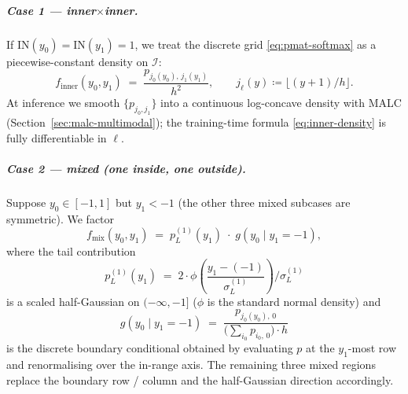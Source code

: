 \subparagraph{Case 1 --- inner$\times$inner.} If
$\mathrm{IN}(y_0)\!=\!\mathrm{IN}(y_1)\!=\!1$, we treat the discrete
grid \eqref{eq:pmat-softmax} as a piecewise-constant density on
$\mathcal{I}$:
\begin{equation}
f_{\mathrm{inner}}(y_0, y_1)
\;=\;
\frac{p_{j_0(y_0),\, j_1(y_1)}}{h^{2}},
\qquad
j_\ell(y) \coloneqq \bigl\lfloor (y + 1)/h \bigr\rfloor.
\label{eq:inner-density}
\end{equation}
At inference we smooth $\{p_{j_0, j_1}\}$ into a continuous log-concave
density with MALC (Section~\ref{sec:malc-multimodal}); the training-time
formula \eqref{eq:inner-density} is fully differentiable in $\ell$.

\subparagraph{Case 2 --- mixed (one inside, one outside).}
Suppose $y_0 \in [-1,1]$ but $y_1 < -1$ (the other three mixed
subcases are symmetric). We factor
\begin{equation}
f_{\mathrm{mix}}(y_0, y_1)
\;=\;
p_{L}^{(1)}(y_1)\; \cdot \; g(y_0 \mid y_1 = -1),
\label{eq:mix-density}
\end{equation}
where the tail contribution
\begin{equation}
p_{L}^{(1)}(y_1)
\;=\;
2 \cdot \phi\!\left(\frac{y_1 - (-1)}{\sigma_{L}^{(1)}}\right)
\bigg/ \sigma_{L}^{(1)}
\end{equation}
is a scaled half-Gaussian on $(-\infty, -1]$ ($\phi$ is the standard
normal density) and
\begin{equation}
g(y_0 \mid y_1 = -1)
\;=\;
\frac{p_{j_0(y_0),\, 0}}{\bigl(\textstyle\sum_{i_0} p_{i_0,\, 0}\bigr) \cdot h}
\label{eq:boundary-conditional}
\end{equation}
is the discrete boundary conditional obtained by evaluating $p$ at the
$y_1$-most row and renormalising over the in-range axis. The remaining
three mixed regions replace the boundary row / column and the
half-Gaussian direction accordingly.

